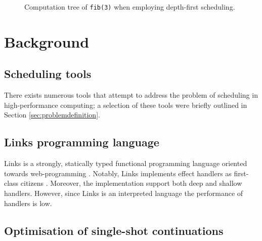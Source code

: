 \documentclass[preprint,10pt,numbers]{sigplanconf}
\begin{document}
\begin{figure}
\begin{center}
\caption{Computation tree of \texttt{fib(3)} when employing depth-first scheduling.}\label{fig:dfs}
\end{center}
\end{figure}
  \section{Background}\label{sec:background}
  \subsection{Scheduling tools}\label{sec:tools}
There exists numerous tools that attempt to address the problem of scheduling in high-performance computing; a selection of these tools were briefly outlined in Section \ref{sec:problemdefinition}.
  \subsection{Links programming language}
  Links is a strongly, statically typed functional programming language oriented towards web-programming \cite{Cooper2006}. Notably, Links implements effect handlers as first-class citizens \cite{Hillerstrom2015}. Moreover, the implementation support both deep and shallow handlers. However, since Links is an interpreted language the performance of handlers is low.

  \subsection{Optimisation of single-shot continuations}
\end{document}
